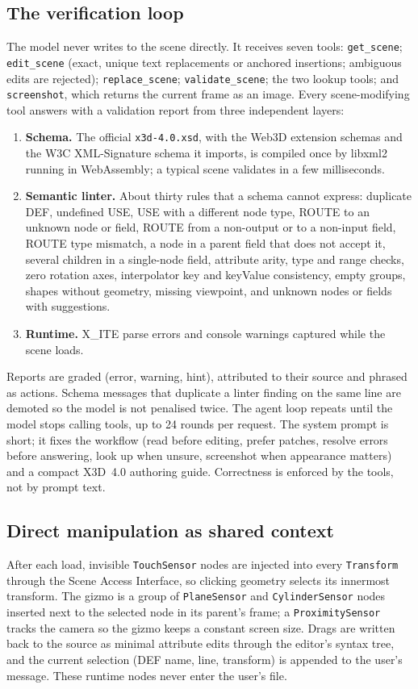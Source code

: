 \documentclass[10pt,a4paper]{article}
\begin{document}
\subsection{The verification loop}
The model never writes to the scene directly. It receives seven tools: \texttt{get\_scene}; \texttt{edit\_scene} (exact, unique text replacements or anchored insertions; ambiguous edits are rejected); \texttt{replace\_scene}; \texttt{validate\_scene}; the two lookup tools; and \texttt{screenshot}, which returns the current frame as an image. Every scene-modifying tool answers with a validation report from three independent layers:
\begin{enumerate}
\item \textbf{Schema.} The official \texttt{x3d-4.0.xsd}, with the Web3D extension schemas and the W3C XML-Signature schema it imports, is compiled once by libxml2 running in WebAssembly; a typical scene validates in a few milliseconds.
\item \textbf{Semantic linter.} About thirty rules that a schema cannot express: duplicate DEF, undefined USE, USE with a different node type, ROUTE to an unknown node or field, ROUTE from a non-output or to a non-input field, ROUTE type mismatch, a node in a parent field that does not accept it, several children in a single-node field, attribute arity, type and range checks, zero rotation axes, interpolator key and keyValue consistency, empty groups, shapes without geometry, missing viewpoint, and unknown nodes or fields with suggestions.
\item \textbf{Runtime.} X\_ITE parse errors and console warnings captured while the scene loads.
\end{enumerate}
Reports are graded (error, warning, hint), attributed to their source and phrased as actions. Schema messages that duplicate a linter finding on the same line are demoted so the model is not penalised twice. The agent loop repeats until the model stops calling tools, up to 24 rounds per request. The system prompt is short; it fixes the workflow (read before editing, prefer patches, resolve errors before answering, look up when unsure, screenshot when appearance matters) and a compact X3D~4.0 authoring guide. Correctness is enforced by the tools, not by prompt text.

\subsection{Direct manipulation as shared context}
After each load, invisible \texttt{TouchSensor} nodes are injected into every \texttt{Transform} through the Scene Access Interface, so clicking geometry selects its innermost transform. The gizmo is a group of \texttt{PlaneSensor} and \texttt{CylinderSensor} nodes inserted next to the selected node in its parent's frame; a \texttt{ProximitySensor} tracks the camera so the gizmo keeps a constant screen size. Drags are written back to the source as minimal attribute edits through the editor's syntax tree, and the current selection (DEF name, line, transform) is appended to the user's message. These runtime nodes never enter the user's file.
\end{document}
